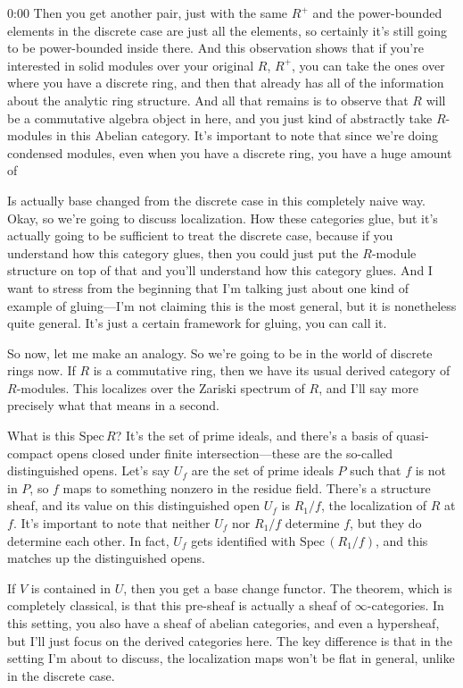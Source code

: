 \begin{unfinished}{0:00}
Then you get another pair, just with the same $R^+$ and the power-bounded elements in the discrete case are just all the elements, so certainly it's still going to be power-bounded inside there. And this observation shows that if you're interested in solid modules over your original $R$, $R^+$, you can take the ones over where you have a discrete ring, and then that already has all of the information about the analytic ring structure. And all that remains is to observe that $R$ will be a commutative algebra object in here, and you just kind of abstractly take $R$-modules in this Abelian category. It's important to note that since we're doing condensed modules, even when you have a discrete ring, you have a huge amount of

Is actually base changed from the discrete case in this completely naive way. Okay, so we're going to discuss localization. How these categories glue, but it's actually going to be sufficient to treat the discrete case, because if you understand how this category glues, then you could just put the $R$-module structure on top of that and you'll understand how this category glues. And I want to stress from the beginning that I'm talking just about one kind of example of gluing---I'm not claiming this is the most general, but it is nonetheless quite general. It's just a certain framework for gluing, you can call it.

So now, let me make an analogy. So we're going to be in the world of discrete rings now. If $R$ is a commutative ring, then we have its usual derived category of $R$-modules. This localizes over the Zariski spectrum of $R$, and I'll say more precisely what that means in a second.

What is this $\text{Spec}\,R$? It's the set of prime ideals, and there's a basis of quasi-compact opens closed under finite intersection---these are the so-called distinguished opens. Let's say $U_f$ are the set of prime ideals $P$ such that $f$ is not in $P$, so $f$ maps to something nonzero in the residue field. There's a structure sheaf, and its value on this distinguished open $U_f$ is $R_1/f$, the localization of $R$ at $f$. It's important to note that neither $U_f$ nor $R_1/f$ determine $f$, but they do determine each other. In fact, $U_f$ gets identified with $\text{Spec}\,(R_1/f)$, and this matches up the distinguished opens.

If $V$ is contained in $U$, then you get a base change functor. The theorem, which is completely classical, is that this pre-sheaf is actually a sheaf of $\infty$-categories. In this setting, you also have a sheaf of abelian categories, and even a hypersheaf, but I'll just focus on the derived categories here. The key difference is that in the setting I'm about to discuss, the localization maps won't be flat in general, unlike in the discrete case.


\end{unfinished}
